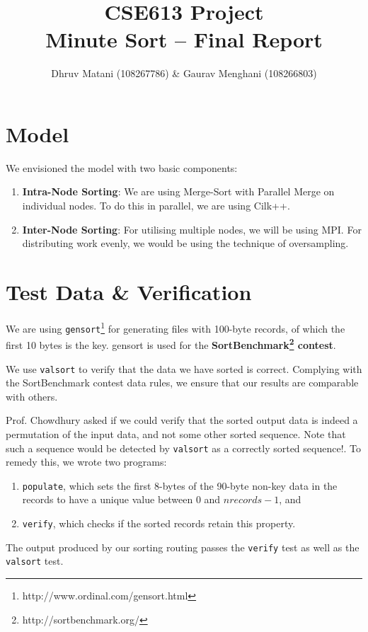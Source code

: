 \documentclass{article}
\title{CSE613 Project\\Minute Sort -- Final Report}
\author{Dhruv Matani (108267786) \& Gaurav Menghani (108266803)}
\begin{document}
\maketitle

\clearpage

\section{Model}
We envisioned the model with two basic components:
\begin{enumerate}
\item {\bf{Intra-Node Sorting}}: We are using Merge-Sort with Parallel Merge on individual nodes. To do this in parallel, 
we are using Cilk++. 

\item {\bf{Inter-Node Sorting}}: For utilising multiple nodes, we will be using MPI. For distributing work evenly, 
we would be using the technique of oversampling.
\end{enumerate}

\section{Test Data \& Verification}
We are using \verb#gensort#\footnote{http://www.ordinal.com/gensort.html} for generating files with 100-byte records, 
of which the first 10 bytes is the key. gensort is used for the {\bf SortBenchmark\footnote{http://sortbenchmark.org/} contest}.

We use \verb#valsort# to verify that the data we have sorted is correct. Complying with the SortBenchmark contest data rules, we ensure that our results are comparable with others.

Prof. Chowdhury asked if we could verify that the sorted output data
is indeed a permutation of the input data, and not some other sorted
sequence. Note that such a sequence would be detected by
\verb#valsort# as a correctly sorted sequence!. To remedy this, we
wrote two programs:

\begin{enumerate}
\item \verb#populate#, which sets the first 8-bytes of the 90-byte
  non-key data in the records to have a unique value between $0$ and
  $nrecords-1$, and
\item \verb#verify#, which checks if the sorted records retain this
  property.
\end{enumerate}

The output produced by our sorting routing passes the \verb#verify# test as well as the \verb#valsort# test.
\end{document}

